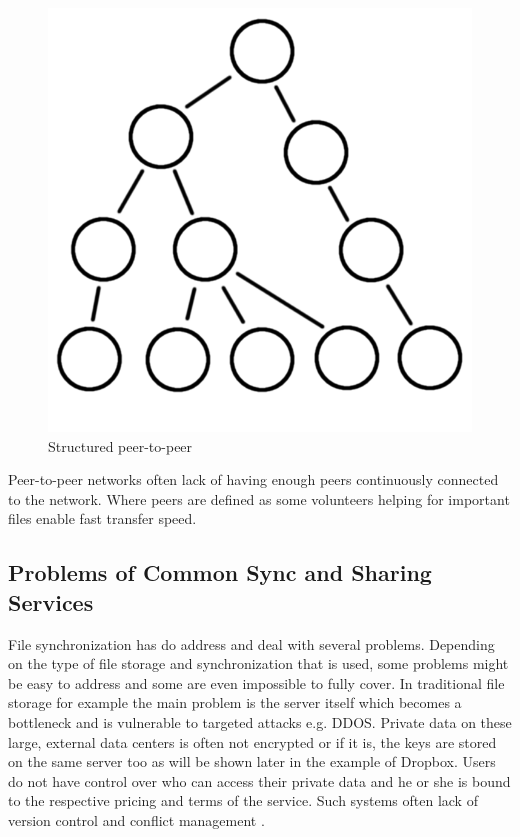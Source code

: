 \begin{enumerate}
\begin{figure}[H]
\begin{center}
		\includegraphics[scale=0.2]{Talk5/structured_p2p.PNG}
		\end{center}
		\caption{Structured peer-to-peer}
		\label{structured_p2p}
	\end{figure}
\end{enumerate}

Peer-to-peer networks often lack of having enough peers continuously connected to the network. Where peers are defined as some volunteers helping for important files enable fast transfer speed.

\subsection{Problems of Common Sync and Sharing Services}
File synchronization has do address and deal with several problems. Depending on the type of file storage and synchronization that is used, some problems might be easy to address and some are even impossible to fully cover. In traditional file storage for example the main problem is the server itself which becomes a bottleneck and is vulnerable to targeted attacks e.g. DDOS. Private data on these large, external data centers is often not encrypted or if it is, the keys are stored on the same server too as will be shown later in the example of Dropbox. Users do not have control over who can access their private data and he or she is bound to the respective pricing and terms of the service. Such systems often lack of version control and conflict management \cite{hive2hive}.

